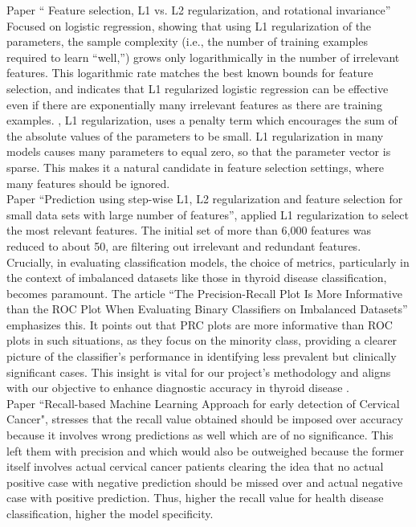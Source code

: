 Paper “ Feature selection, L1 vs. L2 regularization, and rotational invariance” Focused on logistic
regression, showing that using L1 regularization of the parameters, the sample complexity (i.e., the
number of training examples required to learn “well,”) grows only logarithmically in the number of
irrelevant features. This logarithmic rate matches the best known bounds for feature selection, and
indicates that L1 regularized logistic regression can be effective even if there are exponentially many
irrelevant features as there are training examples. , L1 regularization, uses a penalty term which
encourages the sum of the absolute values of the parameters to be small. L1 regularization in many
models causes many parameters to equal zero, so that the parameter vector is sparse. This makes it a
natural candidate in feature selection settings, where many features should be ignored\cite{ng}.\\
Paper ``Prediction using step-wise L1, L2 regularization and feature selection for small data sets with
large number of features”, applied L1 regularization to select the most relevant features. The initial set of
more than 6,000 features was reduced to about 50, are filtering out irrelevant and redundant features\cite{demir_kavuk}.\\
Crucially, in evaluating classification models, the choice of metrics, particularly in the context of imbalanced datasets like those in thyroid disease classification, becomes paramount. The article ``The Precision-Recall Plot Is More Informative than the ROC Plot When Evaluating Binary Classifiers on Imbalanced Datasets” emphasizes this. It points out that PRC plots are more informative than ROC plots in such situations, as they focus on the minority class, providing a clearer picture of the classifier's performance in identifying less prevalent but clinically significant cases. This insight is vital for our project's methodology and aligns with our objective to enhance diagnostic accuracy in thyroid disease \cite{saito_rehmsmeier_2015}.
\\Paper ``Recall-based Machine Learning Approach for early detection of Cervical Cancer", stresses that the recall value obtained should be imposed over accuracy because it involves wrong predictions as well which are of no significance. This left them with precision and which would also be outweighed because the former itself involves actual cervical cancer patients clearing the idea that no actual positive case with negative prediction should be missed over and actual negative case with positive prediction. Thus, higher the recall value for health disease classification, higher the model specificity\cite{recall}.
